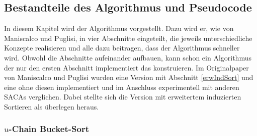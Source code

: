 \subsection{Bestandteile des Algorithmus und Pseudocode} \label{mainPart}
In diesem Kapitel wird der Algorithmus vorgestellt. Dazu wird er, wie von Maniscalco und Puglisi, in vier Abschnitte eingeteilt, die jeweils unterschiedliche Konzepte realisieren und alle dazu beitragen, dass der Algorithmus schneller wird. 
Obwohl die Abschnitte aufeinander aufbauen, kann schon ein Algorithmus der nur den ersten Abschnitt implementiert das \isa konstruieren. Im Originalpaper von Maniscalco und Puglisi wurden eine Version mit Abschnitt \ref{erwIndSort} und eine ohne diesen implementiert und im Anschluss experimentell mit anderen SACAs verglichen. Dabei stellte sich die Version mit erweitertem induzierten Sortieren als überlegen heraus.

\subsubsection{$u$-Chain Bucket-Sort}
\label{4.1}

